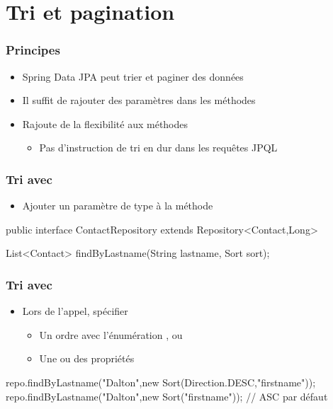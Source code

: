 \section{Tri et pagination}



\begin{frame}
 \frametitle{Principes}
 \begin{itemize}
  \item Spring Data JPA peut trier et paginer des données
  \item Il suffit de rajouter des paramètres dans les méthodes
  \item Rajoute de la flexibilité aux méthodes
  \begin{itemize}
   \item Pas d'instruction de tri en dur dans les requêtes JPQL
  \end{itemize}
 \end{itemize}

\end{frame}

\begin{frame}[fragile]
 \frametitle{Tri avec }
 \begin{itemize}
  \item Ajouter un paramètre de type  à la méthode
 \end{itemize}
 \begin{javacode}
public interface ContactRepository extends Repository<Contact,Long> {

  List<Contact> findByLastname(String lastname, Sort sort);

}
 \end{javacode}
\end{frame}

\begin{frame}[fragile]
 \frametitle{Tri avec }
 \begin{itemize}
  \item Lors de l'appel, spécifier
  \begin{itemize}
   \item Un ordre avec l'énumération ,  ou 
   \item Une ou des propriétés
  \end{itemize}
 \end{itemize}
 \begin{javacode}
repo.findByLastname("Dalton",new Sort(Direction.DESC,"firstname"));
repo.findByLastname("Dalton",new Sort("firstname")); // ASC par d\'efaut
 \end{javacode}
\end{frame}

